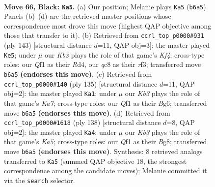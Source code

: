 \documentclass[11pt]{article}
\begin{document}
\clearpage

\begin{figure}[p]\centering
\begin{subfigure}{0.46\textwidth}\centering
\resizebox{\linewidth}{!}{%
\newchessgame
\chessboard[
  setfen={2Q5/6KN/1k6/8/8/8/8/5q2 b - - 2 66},
  showmover=false,
  pgfstyle=straightmove, color=movearrow, markmove={b6-a5}
]}
\caption{}
\end{subfigure}\hfill
\begin{subfigure}{0.46\textwidth}\centering
\resizebox{\linewidth}{!}{%
\newchessgame
\chessboard[
  setfen={8/8/8/5k2/3r4/5R2/6N1/6K1 b - - 2 72},
  showmover=false,
  pgfstyle=straightmove, color=movearrow, markmove={f5-e5}
]}
\caption{}
\end{subfigure}
\\[4pt]
\begin{subfigure}{0.46\textwidth}\centering
\resizebox{\linewidth}{!}{%
\newchessgame
\chessboard[
  setfen={8/8/6b1/8/8/2N5/k2K4/8 b - - 6 68},
  showmover=false,
  pgfstyle=straightmove, color=movearrow, markmove={a2-a1}
]}
\caption{}
\end{subfigure}\hfill
\begin{subfigure}{0.46\textwidth}\centering
\resizebox{\linewidth}{!}{%
\newchessgame
\chessboard[
  setfen={6B1/8/8/K3k3/3n4/8/8/8 w - - 3 70},
  showmover=false,
  pgfstyle=straightmove, color=movearrow, markmove={a5-a4}
]}
\caption{}
\end{subfigure}
\caption{\textbf{Move 66, Black: \texttt{Ka5}.} (a) Our position; Melanie plays \texttt{Ka5} (\texttt{b6a5}). Panels (b)--(d) are the retrieved master positions whose correspondence most drove this move (highest QAP objective among those that transfer to it). (b) Retrieved from \texttt{ccrl\_top\_p0000\#931} (ply 143) [structural distance $d$=11, QAP obj=3]: the master played \texttt{Ke5}; under $\mu$ our \emph{Kb3} plays the role of that game's \emph{Kf4}; cross-type roles: our \emph{Q}f1 as their \emph{R}d4, our \emph{q}c8 as their \emph{r}f3; transferred move \texttt{b6a5} \textbf{(endorses this move)}. (c) Retrieved from \texttt{ccrl\_top\_p0000\#140} (ply 135) [structural distance $d$=11, QAP obj=2]: the master played \texttt{Ka1}; under $\mu$ our \emph{Kb3} plays the role of that game's \emph{Ka7}; cross-type roles: our \emph{Q}f1 as their \emph{B}g6; transferred move \texttt{b6a5} \textbf{(endorses this move)}. (d) Retrieved from \texttt{ccrl\_top\_p0000\#1618} (ply 138) [structural distance $d$=8, QAP obj=2]: the master played \texttt{Ka4}; under $\mu$ our \emph{Kb3} plays the role of that game's \emph{Ka5}; cross-type roles: our \emph{Q}f1 as their \emph{B}g8; transferred move \texttt{b6a5} \textbf{(endorses this move)}. Synthesis: 8 retrieved analogs transferred to \texttt{Ka5} (summed QAP objective 18, the strongest correspondence among the candidate moves); Melanie committed it via the \texttt{search} selector.}
\label{fig:thought-m131}
\end{figure}
\end{document}
